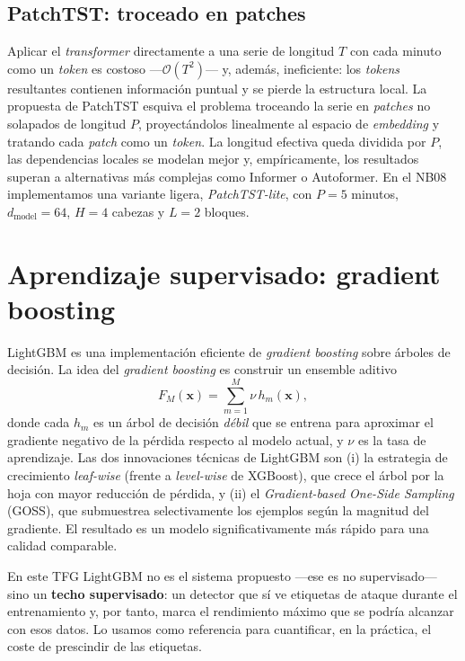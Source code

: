 \subsection{PatchTST: troceado en patches}

Aplicar el \textit{transformer} directamente a una serie de longitud $T$ con cada minuto como un \textit{token} es costoso ---$\mathcal{O}(T^2)$--- y, además, ineficiente: los \textit{tokens} resultantes contienen información puntual y se pierde la estructura local. La propuesta de PatchTST \cite{nie2023patchtst} esquiva el problema troceando la serie en \emph{patches} no solapados de longitud $P$, proyectándolos linealmente al espacio de \textit{embedding} y tratando cada \emph{patch} como un \textit{token}. La longitud efectiva queda dividida por $P$, las dependencias locales se modelan mejor y, empíricamente, los resultados superan a alternativas más complejas como Informer o Autoformer. En el NB08 implementamos una variante ligera, \textit{PatchTST-lite}, con $P=5$ minutos, $d_{\mathrm{model}}=64$, $H=4$ cabezas y $L=2$ bloques.

\section{Aprendizaje supervisado: gradient boosting}
\label{sec:teo-lgbm}

LightGBM \cite{ke2017lightgbm} es una implementación eficiente de \emph{gradient boosting} sobre árboles de decisión. La idea del \emph{gradient boosting} \cite{friedman2001gbm} es construir un ensemble aditivo
\begin{equation}
F_M(\bm{x}) = \sum_{m=1}^{M} \nu \, h_m(\bm{x}),
\label{eq:boosting}
\end{equation}
donde cada $h_m$ es un árbol de decisión \emph{débil} que se entrena para aproximar el gradiente negativo de la pérdida respecto al modelo actual, y $\nu$ es la tasa de aprendizaje. Las dos innovaciones técnicas de LightGBM son (i) la estrategia de crecimiento \emph{leaf-wise} (frente a \emph{level-wise} de XGBoost), que crece el árbol por la hoja con mayor reducción de pérdida, y (ii) el \emph{Gradient-based One-Side Sampling} (GOSS), que submuestrea selectivamente los ejemplos según la magnitud del gradiente. El resultado es un modelo significativamente más rápido para una calidad comparable.

En este TFG LightGBM no es el sistema propuesto ---ese es no supervisado--- sino un \textbf{techo supervisado}: un detector que sí ve etiquetas de ataque durante el entrenamiento y, por tanto, marca el rendimiento máximo que se podría alcanzar con esos datos. Lo usamos como referencia para cuantificar, en la práctica, el coste de prescindir de las etiquetas.

